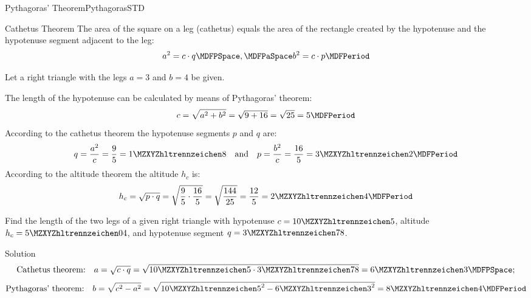 \begin{MXContent}{Pythagoras' Theorem}{Pythagoras}{STD}
\begin{MCOSHZusatz}
\begin{MXInfo}{Cathetus Theorem}
The area of the square on a leg (cathetus) equals the area of the rectangle created 
by the hypotenuse and the hypotenuse segment adjacent to the leg:
\[a^2 = c\cdot q \MDFPSpace, \MDFPaSpace b^2=c\cdot p \MDFPeriod\]
\end{MXInfo}

\begin{MExample}
Let a right triangle with the legs $a=3$ and $b=4$ be given.

The length of the hypotenuse can be calculated by means of Pythagoras' theorem:
\[
c = \sqrt{a^2 + b^2}=\sqrt{9 + 16}=\sqrt{25}=5 \MDFPeriod %
\]
According to the cathetus theorem the hypotenuse segments  $p$ and $q$ are:
\[
q=\frac{a^2}{c}=\frac{9}{5} = \MZahl{1}{8} \quad \text{and} \quad 
p=\frac{b^2}{c}=\frac{16}{5} = \MZahl{3}{2} \MDFPeriod
\]
According to the altitude theorem the altitude $h_c$ is:
\[
h_c=\sqrt{p\cdot q}=\sqrt{\frac{9}{5}\cdot\frac{16}{5}} %
=\sqrt{\frac{144}{25}}=\frac{12}{5} = \MZahl{2}{4} \MDFPeriod\]
\end{MExample}

\begin{MExercise}
Find the length of the two legs of a given right triangle with hypotenuse
$c=\MZahl{10}{5}$, altitude $h_c=\MZahl{5}{04}$,
and hypotenuse segment $q=\MZahl{3}{78}$.

\begin{MHint}{Solution}
\[\text{Cathetus theorem:} \quad a=\sqrt{c\cdot q}=\sqrt{\MZahl{10}{5} \cdot \MZahl{3}{78}}=\MZahl{6}{3} \MDFPSpace;\]
\[\text{Pythagoras' theorem:} \quad b=\sqrt{c^2-a^2} = \sqrt{{\MZahl{10}{5}}^2-{\MZahl{6}{3}}^2}=\MZahl{8}{4} \MDFPeriod\]
\end{MHint}
\end{MExercise}
\end{MCOSHZusatz}

\end{MXContent}

